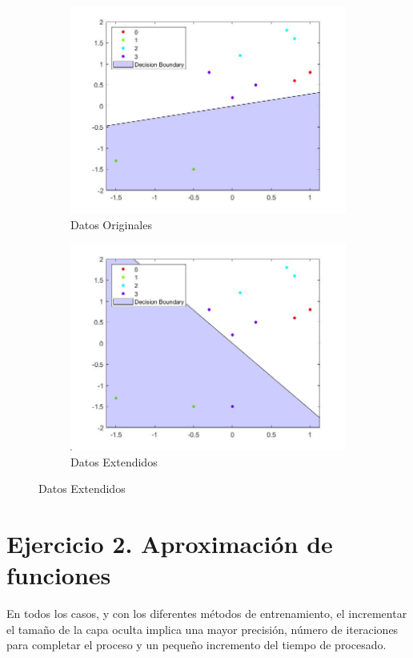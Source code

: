 \documentclass{article}
\begin{document}
\begin{figure}[H]
 \centering
 \begin{subfigure}{0.45\textwidth}
  \includegraphics[width=0.9\linewidth]{../images/I_ex1_basicData.jpg}
  \caption{Datos Originales}
 \end{subfigure}
 \begin{subfigure}{0.45\textwidth}
  \includegraphics[width=0.9\linewidth]{../images/I_ex1_extendedData.jpg}
  \caption{Datos Extendidos}
 \end{subfigure}
\end{figure}

\section{Ejercicio 2. Aproximación de funciones}

En todos los casos, y con los diferentes métodos de entrenamiento, el
incrementar el tamaño de la capa oculta implica una mayor precisión, número de
iteraciones para completar el proceso y un pequeño incremento del tiempo de
procesado.
\end{document}
